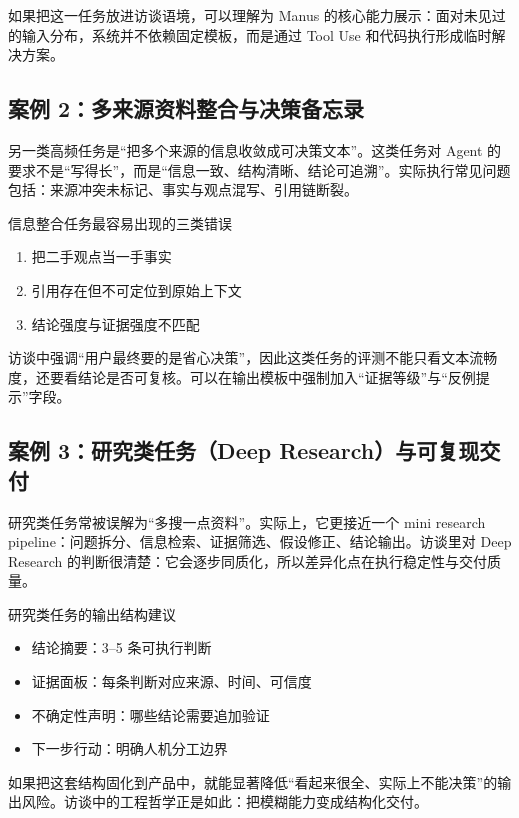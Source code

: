 \documentclass[a4paper]{article}
\begin{document}
如果把这一任务放进访谈语境，可以理解为 Manus 的核心能力展示：面对未见过的输入分布，系统并不依赖固定模板，而是通过 Tool Use 和代码执行形成临时解决方案。

\subsection{案例 2：多来源资料整合与决策备忘录}

另一类高频任务是“把多个来源的信息收敛成可决策文本”。这类任务对 Agent 的要求不是“写得长”，而是“信息一致、结构清晰、结论可追溯”。实际执行常见问题包括：来源冲突未标记、事实与观点混写、引用链断裂。

\begin{warningbox}{信息整合任务最容易出现的三类错误}
\begin{enumerate}
    \item 把二手观点当一手事实
    \item 引用存在但不可定位到原始上下文
    \item 结论强度与证据强度不匹配
\end{enumerate}
\end{warningbox}

访谈中强调“用户最终要的是省心决策”，因此这类任务的评测不能只看文本流畅度，还要看结论是否可复核。可以在输出模板中强制加入“证据等级”与“反例提示”字段。

\subsection{案例 3：研究类任务（Deep Research）与可复现交付}

研究类任务常被误解为“多搜一点资料”。实际上，它更接近一个 mini research pipeline：问题拆分、信息检索、证据筛选、假设修正、结论输出。访谈里对 Deep Research 的判断很清楚：它会逐步同质化，所以差异化点在执行稳定性与交付质量。

\begin{knowledgebox}{研究类任务的输出结构建议}
\begin{itemize}
    \item 结论摘要：3--5 条可执行判断
    \item 证据面板：每条判断对应来源、时间、可信度
    \item 不确定性声明：哪些结论需要追加验证
    \item 下一步行动：明确人机分工边界
\end{itemize}
\end{knowledgebox}

如果把这套结构固化到产品中，就能显著降低“看起来很全、实际上不能决策”的输出风险。访谈中的工程哲学正是如此：把模糊能力变成结构化交付。
\end{document}
